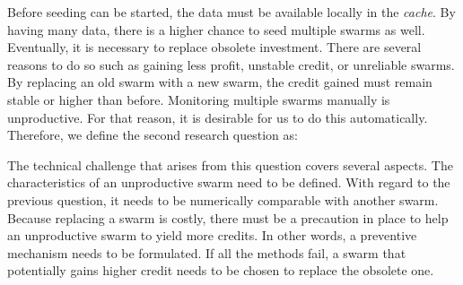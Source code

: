 
Before seeding can be started, the data must be available locally in the \textit{cache}. By having many data, there is a higher chance to seed multiple swarms as well. Eventually, it is necessary to replace obsolete investment. There are several reasons to do so such as gaining less profit, unstable credit, or unreliable swarms. By replacing an old swarm with a new swarm, the credit gained must remain stable or higher than before. Monitoring multiple swarms manually is unproductive. For that reason, it is desirable for us to do this automatically. Therefore, we define the second research question as: 

	
The technical challenge that arises from this question covers several aspects. The characteristics of an unproductive swarm need to be defined. With regard to the previous question, it needs to be numerically comparable with another swarm. Because replacing a swarm is costly, there must be a precaution in place to help an unproductive swarm to yield more credits. In other words, a preventive mechanism needs to be formulated. If all the methods fail, a swarm that potentially gains higher credit needs to be chosen to replace the obsolete one. 